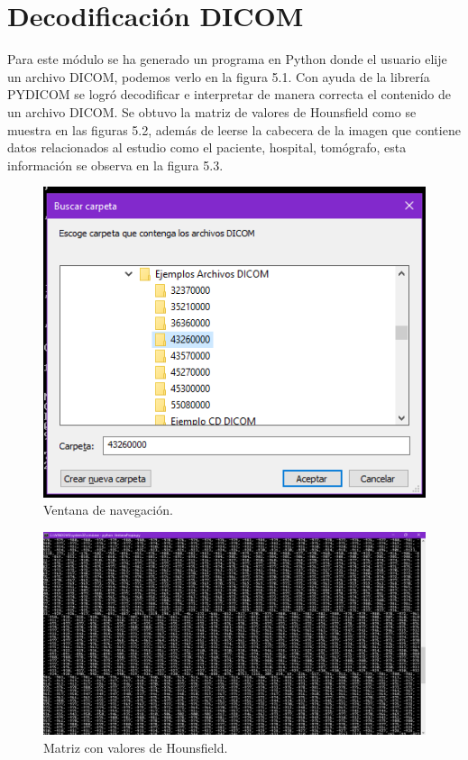 \documentclass[12pt]{report}
\begin{document}
\section{Decodificación DICOM}
Para este módulo se ha generado un programa en Python donde el usuario elije un archivo DICOM, podemos verlo en la figura 5.1. Con ayuda de la librería PYDICOM se logró decodificar e interpretar de manera correcta el contenido de un archivo DICOM. Se obtuvo la matriz de valores de Hounsfield como se muestra en las figuras 5.2, además de leerse la cabecera de la imagen que contiene datos relacionados al estudio como el paciente, hospital, tomógrafo, esta información se observa en la figura 5.3.

\begin{figure}[H]
\centering
\includegraphics[width = 5 cm, height = 5 cm]{navega}
\caption{Ventana de navegación.}
\end{figure}

\begin{figure}[H]
\centering
\includegraphics[width = 12 cm, height = 18 cm]{matriz}
\caption{Matriz con valores de Hounsfield.}
\end{figure}
\end{document}
